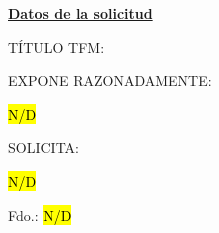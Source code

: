 \documentclass[11pt,a4paper,oneside]{article}
\newcommand{\AnnexNA}{\hl{N/D}}
\begin{document}
{\vspace{0.4cm}

\noindent\textbf{\underline{Datos de la solicitud}}

\vspace{0.25cm}

\noindent\hspace*{0.5cm}\begin{minipage}[t]{\dimexpr\textwidth-0.5cm\relax}
\raggedright TÍTULO TFM: \myBookTitle
\end{minipage}

\vspace{0.25cm}

\hspace*{0.5cm}EXPONE RAZONADAMENTE:

\vspace{0.15cm}

\hspace*{0.5cm}\AnnexNA

\vspace{0.75cm}

\hspace*{0.5cm}SOLICITA:

\vspace{0.15cm}

\hspace*{0.5cm}\AnnexNA

\vspace{0.75cm}

\vspace*{1cm}

\begin{center}
Fdo.: \AnnexNA
\end{center}

\vspace*{\fill}

}
\end{document}
